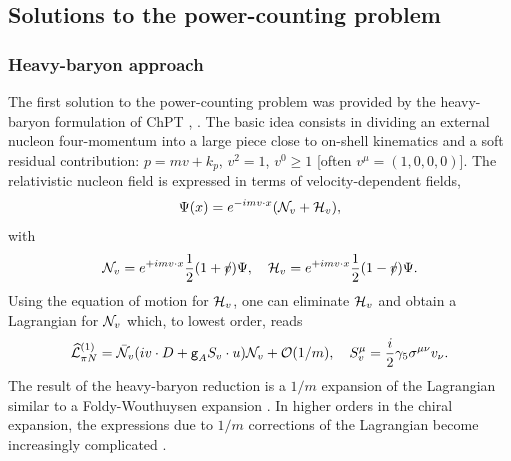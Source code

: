 \documentclass[twoside,12pt]{article}
\begin{document}
\subsection{Solutions to the power-counting problem}

\subsubsection{Heavy-baryon approach}
\label{hb}
   The first solution to the power-counting problem
was provided by the heavy-baryon formulation of ChPT \cite{Jenkins:1990jv},
\cite{Bernard:1992qa}.
   The basic idea consists in dividing an external nucleon four-momentum
into a large piece close to on-shell kinematics and a soft residual contribution:
$p = m v +k_p$, $v^2=1$, $v^0\ge 1$
[often $v^\mu = (1,0,0,0)$].
   The relativistic nucleon field is expressed in terms of
velocity-dependent fields,
\begin{displaymath}
\Psi(x)=e^{-im v \cdot x} ({\cal N}_v +{\cal H}_v),
\end{displaymath}
with
\begin{displaymath}
{\cal N}_v=e^{+im v\cdot x}\frac{1}{2}(1+v\hspace{-.5em}/)\Psi,\quad
{\cal H}_v=e^{+im v\cdot x}\frac{1}{2}(1-v\hspace{-.5em}/)\Psi.
\end{displaymath}
   Using the equation of motion for ${\cal H}_v$, one can
eliminate ${\cal H}_v$ and obtain a Lagrangian for ${\cal N}_v$
which, to lowest order, reads \cite{Bernard:1992qa}
\begin{displaymath}
\widehat{\cal L}^{(1)}_{\pi N}=\bar{\cal N}_v(iv\cdot D + \texttt{g}_A S_v\cdot u)
{\cal N}_v+{\cal O}(1/m),\quad S^\mu_v=\frac{i}{2}\gamma_5\sigma^{\mu\nu}v_\nu.
\end{displaymath}
   The result of the heavy-baryon reduction is a $1/m$ expansion of the
Lagrangian similar to a Foldy-Wouthuysen expansion \cite{Foldy:1949wa}.
   In higher orders in the chiral expansion, the expressions due to
$1/m$ corrections of the Lagrangian become increasingly complicated
\cite{Fettes:2000gb}.
\end{document}
